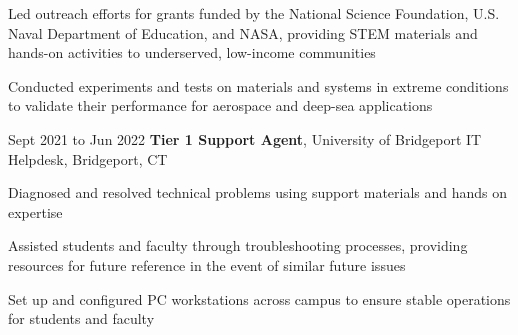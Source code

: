     \vspace{0.10 cm}
    \begin{onecolentry}
        \begin{highlights}
            \item Led outreach efforts for grants funded by the National Science Foundation, U.S. Naval Department of Education, and NASA, providing STEM materials and hands-on activities to underserved, low-income communities
            \item Conducted experiments and tests on materials and systems in extreme conditions to validate their performance for aerospace and deep-sea applications
        \end{highlights}
    \end{onecolentry}

    \vspace{0.2 cm}

    \begin{twocolentry}{
        Sept 2021 to Jun 2022
    }
        \textbf{Tier 1 Support Agent}, University of Bridgeport IT Helpdesk, Bridgeport, CT\end{twocolentry}

    \vspace{0.10 cm}
    \begin{onecolentry}
        \begin{highlights}
            \item Diagnosed and resolved technical problems using support materials and hands on expertise
            \item Assisted students and faculty through troubleshooting processes, providing resources for future reference in the event of similar future issues
            \item Set up and configured PC workstations across campus to ensure stable operations for students and faculty
        \end{highlights}
    \end{onecolentry}